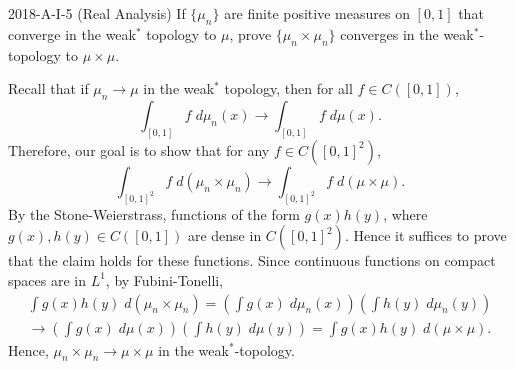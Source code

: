 \documentclass{article}
\begin{document}
\begin{prb}{2018-A-I-5 (Real Analysis)}
	If $\{\mu_{n}\}$ are finite positive measures on $[0,1]$ that converge in the weak$^{\ast}$ topology to $\mu$, prove $\{\mu_{n} \times \mu_{n}\}$ converges in the weak$^{\ast}$-topology to $\mu \times \mu$. 
\end{prb}
\begin{solutions}
	Recall that if $\mu_{n} \to \mu$ in the weak$^{\ast}$ topology, then for all $f \in C([0,1])$, 
		\begin{equation}
			\int_{[0,1]}f\;d\mu_{n}(x) \to \int_{[0,1]}f\;d\mu(x). 
		\end{equation}
	Therefore, our goal is to show that for any $f \in C([0,1]^{2})$, 
		\begin{equation}
			\int_{[0,1]^{2}}f\;d(\mu_{n} \times \mu_{n}) \longrightarrow \int_{[0,1]^{2}}f\;d(\mu \times \mu). 
		\end{equation}
	By the Stone-Weierstrass, functions of the form $g(x)h(y)$, where $g(x), h(y) \in C([0,1])$ are dense in $C([0,1]^{2})$. Hence it suffices to prove that the claim holds for these functions. Since continuous functions on compact spaces are in $L^{1}$, by Fubini-Tonelli, 
		\begin{multline}
			\int g(x)h(y)\;d(\mu_{n}\times \mu_{n}) = \left(\int g(x)\;d\mu_{n}(x)\right)\left(\int h(y)\;d\mu_{n}(y)\right)  \\
			\longrightarrow \left(\int g(x)\;d\mu(x)\right)\left(\int h(y)\;d\mu(y)\right) = \int g(x)h(y)\;d(\mu \times\mu). 
		\end{multline}
	Hence, $\mu_{n} \times \mu_{n} \to \mu \times \mu$ in the weak$^{\ast}$-topology. 
\end{solutions}
\end{document}

